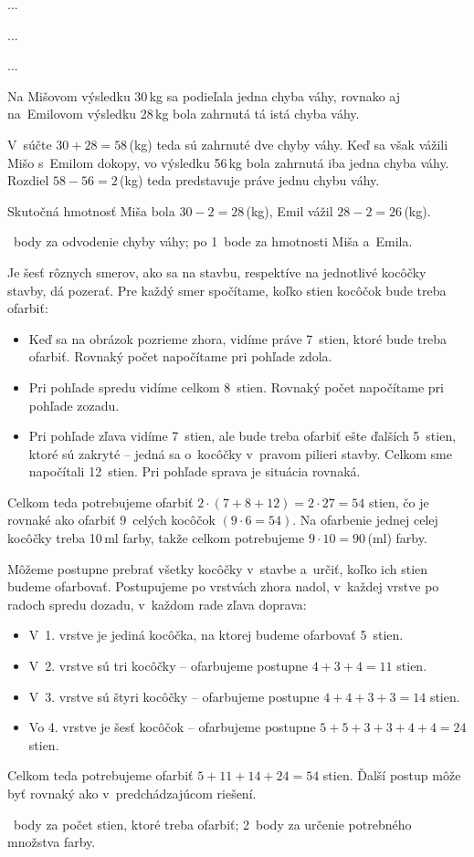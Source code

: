 {%
...}

{%
...}

{%
...}

{%
Na Mišovom výsledku 30\,kg sa podieľala jedna chyba váhy,
rovnako aj na~Emilovom výsledku 28\,kg bola zahrnutá tá istá chyba váhy.

V~súčte $30+28=58$\,(kg) teda sú zahrnuté dve chyby váhy.
Keď sa však vážili Mišo s~Emilom dokopy, vo výsledku 56\,kg bola
zahrnutá iba jedna chyba váhy.
Rozdiel $58-56=2$\,(kg) teda predstavuje práve jednu chybu váhy.

Skutočná hmotnosť Miša bola $30-2=28$\,(kg),
Emil vážil $28-2=26$\,(kg).

~body za odvodenie chyby váhy;
po 1~bode za hmotnosti Miša a~Emila.
\endhodnotenie}

{%
Je šesť rôznych smerov, ako sa na stavbu, respektíve na jednotlivé kocôčky
stavby, dá pozerať.
Pre každý smer spočítame, koľko stien kocôčok bude treba ofarbiť:
\begin{itemize}
  \item
    Keď sa na obrázok pozrieme zhora, vidíme práve 7~stien, ktoré bude treba
    ofarbiť.
    Rovnaký počet napočítame pri pohľade zdola.
  \item
    Pri pohľade spredu vidíme celkom 8~stien.
    Rovnaký počet napočítame pri pohľade zozadu.
  \item
    Pri pohľade zľava vidíme 7~stien, ale bude treba ofarbiť ešte
    ďalších 5~stien, ktoré sú zakryté -- jedná sa o~kocôčky v~pravom
    pilieri stavby.
    Celkom sme napočítali 12~stien.
    Pri pohľade sprava je situácia rovnaká.
\end{itemize}
Celkom teda potrebujeme ofarbiť $2\cdot(7+8+12)=2\cdot27=54$ stien,
čo je rovnaké ako ofarbiť 9~celých kocôčok $(9\cdot6=54)$.
Na ofarbenie jednej celej kocôčky treba 10\,ml farby, takže celkom
potrebujeme $9\cdot 10=90$\,(ml) farby.

\ineriesenie
Môžeme postupne prebrať všetky kocôčky v~stavbe a~určiť,
koľko ich stien budeme ofarbovať.
Postupujeme po vrstvách zhora nadol,
v~každej vrstve po radoch spredu dozadu,
v~každom rade zľava doprava:
\begin{itemize}
  \item
    V~1. vrstve je jediná kocôčka, na ktorej budeme ofarbovať 5~stien.
  \item
    V~2. vrstve sú tri kocôčky -- ofarbujeme postupne $4+3+4=11$ stien.
  \item
    V~3. vrstve sú štyri kocôčky -- ofarbujeme postupne $4+4+3+3=14$ stien.
  \item
    Vo 4. vrstve je šesť kocôčok -- ofarbujeme postupne $5+5+3+3+4+4=24$ stien.
\end{itemize}
Celkom teda potrebujeme ofarbiť $5+11+14+24=54$ stien.
Ďalší postup môže byť rovnaký ako v~predchádzajúcom riešení.

~body za počet stien, ktoré treba ofarbiť;
2~body za určenie potrebného množstva farby.
\endhodnotenie
}

